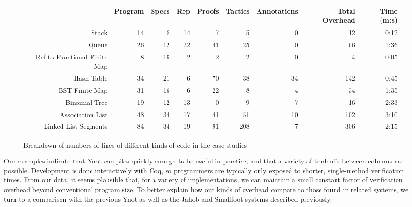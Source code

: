 \documentclass[preprint,nocopyrightspace]{sigplanconf}
\begin{document}
{\begin{figure*}
  \begin{center}
    \begin{tabular}{r | r | r | r | r | r | r | r | r}
                                             & Program & Specs & Rep & Proofs & Tactics &  Annotations    & Total Overhead & Time (m:s) \\ \hline
Stack                                        &   14    &  8    &  14 &  7     &    5    &      0          &    12       & 0:12 \\
Queue                                        &   26    &  12   &  22 &  41    &    25   &      0          &    66       & 1:36 \\
Ref to Functional Finite Map                 &    8    &  16   &   2 &   2    &     2   &     0           &     4       & 0:05 \\
Hash Table                                   &   34    &  21   &  6  &  70    &   38    &     34          &   142       & 0:45 \\
BST Finite Map                               &   31    &  16   &  6  &  22    &    8    &      4          &    34       & 1:35 \\
Binomial Tree                                &   19    &  12   &  13 &   0    &    9    &      7          &    16       & 2:33 \\
Association List                             &   48    &  34   &  17 &  41    &   51    &     10          &   102       & 3:10 \\
Linked List Segments                         &   84    &  34   &  19 &  91   &   208   &       7         &    306      &  2:15 \\
    \end{tabular}
  \end{center}
\footnotesize
\normalsize
  \caption{\label{loc}Breakdown of numbers of lines of different kinds of code in the case studies}
\end{figure*}

Our examples indicate that Ynot compiles quickly enough to be useful in practice, and that a variety of tradeoffs between columns are possible.  Development is done interactively with Coq, so programmers are typically only exposed to shorter, single-method verification times.  From our data, it seems plausible that, for a variety of implementations, we can maintain a small constant factor of verification overhead beyond conventional program size.  To better explain how our kinds of overhead compare to those found in related systems, we turn to a comparison with the previous Ynot as well as the Jahob and Smallfoot systems described previously.

}
\end{document}

